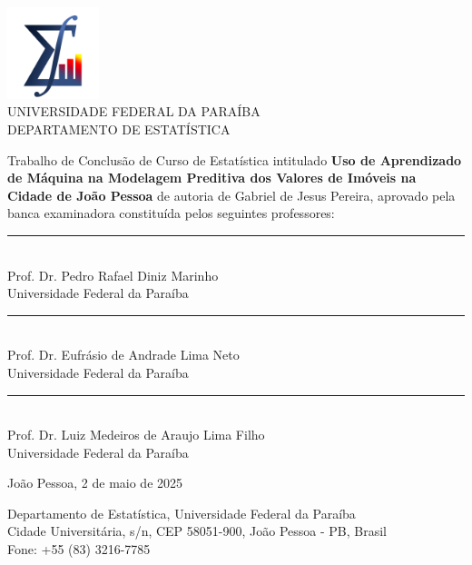 \documentclass[
  12pt,
  a4paper,
]{scrreprt}
\begin{document}


\pagestyle{fancy}

\fancyhf{}
\fancyhead[RO, LE]{\thepage}
\fancyhead[LO]{\leftmark}
\fancyhead[RE]{\thepage}


\newpage
\thispagestyle{empty}

\begin{center}
  \includegraphics[width=0.2\textwidth]{includes/logode.png} \\
  UNIVERSIDADE FEDERAL DA PARAÍBA \\
  DEPARTAMENTO DE ESTATÍSTICA \\
\end{center}

\vspace{1cm}

\noindent \hspace{0.8cm}

\begin{minipage}{0.9\textwidth}
  \setlength{\parindent}{0.4cm}
  Trabalho de Conclusão de Curso de Estatística intitulado \textbf{Uso de Aprendizado de Máquina na Modelagem Preditiva dos Valores de Imóveis na Cidade de João Pessoa} de autoria de Gabriel de Jesus Pereira, aprovado pela banca examinadora constituída pelos seguintes professores:
\end{minipage}

\vfill

\begin{center}
  \noindent\rule{14cm}{0.4pt} \\
  Prof. Dr. Pedro Rafael Diniz Marinho \\
  Universidade Federal da Paraíba

  \vfill

  \noindent\rule{14cm}{0.4pt} \\
  Prof. Dr. Eufrásio de Andrade Lima Neto \\
  Universidade Federal da Paraíba

  \vfill

  \noindent\rule{14cm}{0.4pt} \\
  Prof. Dr. Luiz Medeiros de Araujo Lima Filho \\
  Universidade Federal da Paraíba

  \vfill

  João Pessoa, 2 de maio de 2025

  \vfill

  \small Departamento de Estatística, Universidade Federal da Paraíba \\
  \small Cidade Universitária, s/n, CEP 58051-900, João Pessoa - PB, Brasil \\
  \small Fone: +55 (83) 3216-7785
\end{center}
\end{document}
